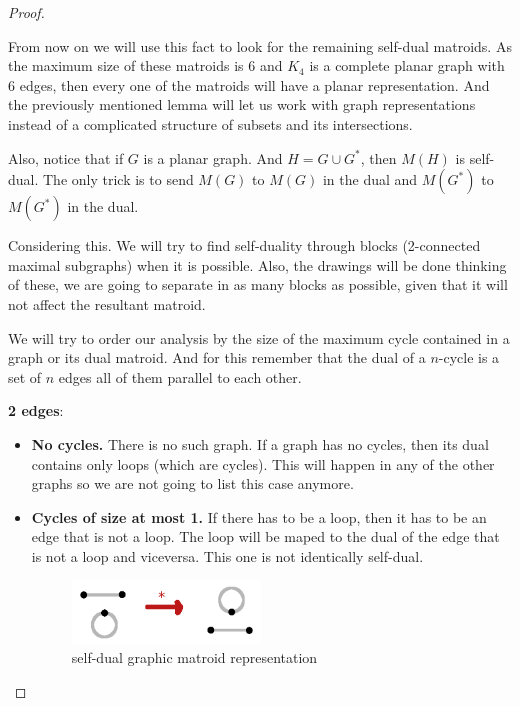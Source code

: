 \begin{proof}
\begin{enumerate}[label=(\roman*)]
            From now on we will use this fact to look for the remaining self-dual matroids. As the maximum size of these matroids
            is $6$ and $K_4$ is a complete planar graph with 6 edges, then every one of the matroids will have a planar representation. 
            And the previously mentioned lemma will let us work with graph representations instead of a complicated structure of 
            subsets and its intersections.\pn
            
            Also, notice that if $G$ is a planar graph. And $H = G \cup G^*$, then $M(H)$ is self-dual. The only
            trick is to send $M(G)$ to $M(G)$ in the dual and $M(G^*)$ to $M(G^*)$ in the dual.\pn
            
            Considering this. We will try to find self-duality through blocks (2-connected maximal subgraphs) when it is possible.
            Also, the drawings will be done thinking of these, we are going to separate in as many blocks as possible, given that
            it will not affect the resultant matroid.\pn
            
            We will try to order our analysis by the size of the maximum cycle contained in a graph or its dual matroid. And for this
            remember that the dual of a $n$-cycle is a set of $n$ edges all of them parallel to each other.\pn            
            
            \textbf{2 edges}:\pn
                \begin{itemize}
                    \item \textbf{No cycles.}
                        There is no such graph. If a graph has no cycles, then its dual contains only loops (which are cycles).
                        This will happen in any of the other graphs so we are not going to list this case anymore.
                    
                    \item \textbf{Cycles of size at most 1.}
                        If there has to be a loop, then it has to be an edge that is not a loop. The loop will be maped to the dual of
                        the edge that is not a loop and viceversa. This one is not identically self-dual. 
                        
                        \begin{figure}[H]
                            \begin{center}
                            \includegraphics[width=5cm]{Test2/Problem1/1_0.png}
                            \end{center}
                            \caption{self-dual graphic matroid representation}
                            \label{t2:p1_1_0.png}  
                        \end{figure}\pn
                        

\end{itemize}
\end{enumerate}
\end{proof}
